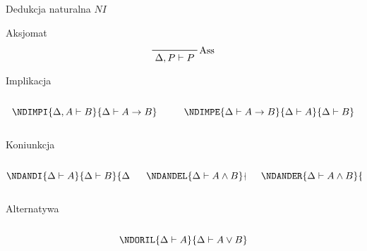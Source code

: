 \documentclass{beamer}
\newcommand{\imp}{\rightarrow}
\newcommand{\NDASS}[1]{\prfbyaxiom{Ass}{#1}}
\begin{document}
\begin{frame}{Dedukcja naturalna $NI$}
   {
    \begin{block}{Aksjomat}
      $$ \NDASS{\Delta, P \vdash P} $$
    \end{block}
  }

  \pause

  \begin{block}{Implikacja}
    \begin{columns}
      \begin{column}{0.5\textwidth}
        $$
        \NDIMPI {\Delta, A \vdash B}
          {\Delta \vdash A \imp B}
        $$
      \end{column}

      \begin{column}{0.5\textwidth}
        $$
        \NDIMPE {\Delta \vdash A \imp B} {\Delta \vdash A}
          {\Delta \vdash B}
        $$
      \end{column}
    \end{columns}
  \end{block}

  \pause

  \begin{block}{Koniunkcja}
    \begin{columns}
      \begin{column}{0.33\textwidth}
        $$
        \NDANDI {\Delta \vdash A} {\Delta \vdash B} 
          {\Delta \vdash A \land B}
        $$
      \end{column}

      \begin{column}{0.33\textwidth}
        $$
        \NDANDEL {\Delta \vdash A \land B}
          {\Delta \vdash A}
        $$
      \end{column}

      \begin{column}{0.33\textwidth}
        $$
        \NDANDER {\Delta \vdash A \land B}
          {\Delta \vdash B}
        $$
      \end{column}
    \end{columns}
  \end{block}

  \pause

  \begin{block}{Alternatywa}
    \begin{columns}
      \begin{column}{0.5\textwidth}
        $$
        \NDORIL
          {\Delta \vdash A}
          {\Delta \vdash A \lor B}
        $$
      \end{column}


\end{columns}
\end{block}
\end{frame}
\end{document}
